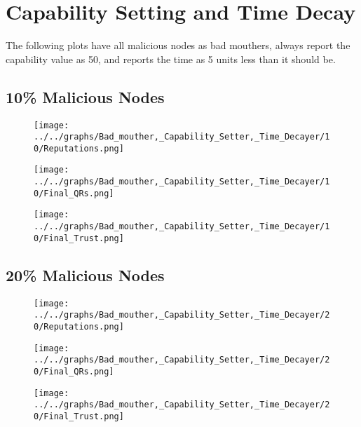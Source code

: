 \section*{Capability Setting and Time Decay}
The following plots have all malicious nodes as bad mouthers, always
report the capability value as 50, and reports the time as 5 units less than
it should be.
\\
\begin{minipage}[t]{0.49\columnwidth}
\subsection*{10\% Malicious Nodes}
    \begin{figure}[H]
        \centering
        \texttt{[image: ../../graphs/Bad\_mouther,\_Capability\_Setter,\_Time\_Decayer/10/Reputations.png]}
    \end{figure}
    \begin{figure}[H]
        \centering
        \texttt{[image: ../../graphs/Bad\_mouther,\_Capability\_Setter,\_Time\_Decayer/10/Final\_QRs.png]}
    \end{figure}
\end{minipage}
\begin{minipage}[t]{0.49\columnwidth}
    \begin{figure}[H]
        \centering
        \texttt{[image: ../../graphs/Bad\_mouther,\_Capability\_Setter,\_Time\_Decayer/10/Final\_Trust.png]}
    \end{figure}
\end{minipage}

\begin{minipage}[t]{0.49\columnwidth}
\subsection*{20\% Malicious Nodes}
    \begin{figure}[H]
        \centering
        \texttt{[image: ../../graphs/Bad\_mouther,\_Capability\_Setter,\_Time\_Decayer/20/Reputations.png]}
    \end{figure}
    \begin{figure}[H]
        \centering
        \texttt{[image: ../../graphs/Bad\_mouther,\_Capability\_Setter,\_Time\_Decayer/20/Final\_QRs.png]}
    \end{figure}
\end{minipage}
\begin{minipage}[t]{0.49\columnwidth}
    \begin{figure}[H]
        \centering
        \texttt{[image: ../../graphs/Bad\_mouther,\_Capability\_Setter,\_Time\_Decayer/20/Final\_Trust.png]}
    \end{figure}
\end{minipage}


